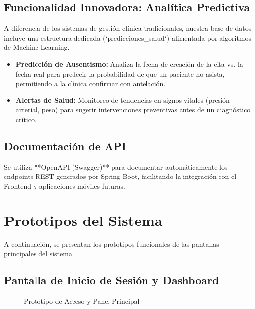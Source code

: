 \documentclass[12pt, a4paper]{article}
\begin{document}
	\subsection{Funcionalidad Innovadora: Analítica Predictiva}
	A diferencia de los sistemas de gestión clínica tradicionales, nuestra base de datos incluye una estructura dedicada (`predicciones_salud`) alimentada por algoritmos de Machine Learning.
	\begin{itemize}
		\item \textbf{Predicción de Ausentismo:} Analiza la fecha de creación de la cita vs. la fecha real para predecir la probabilidad de que un paciente no asista, permitiendo a la clínica confirmar con antelación.
		\item \textbf{Alertas de Salud:} Monitoreo de tendencias en signos vitales (presión arterial, peso) para sugerir intervenciones preventivas antes de un diagnóstico crítico.
	\end{itemize}
	
	\subsection{Documentación de API}
	Se utiliza **OpenAPI (Swagger)** para documentar automáticamente los endpoints REST generados por Spring Boot, facilitando la integración con el Frontend y aplicaciones móviles futuras.
	
	\section{Prototipos del Sistema}
	
	A continuación, se presentan los prototipos funcionales de las pantallas principales del sistema.
	
	\subsection{Pantalla de Inicio de Sesión y Dashboard}
	\begin{figure}[H]
		\centering
		\caption{Prototipo de Acceso y Panel Principal}
	\end{figure}
	
\end{document}
